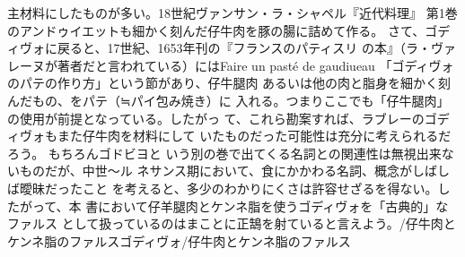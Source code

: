 {{{{  主材料にしたものが多い。18世紀ヴァンサン・ラ・シャペル『近代料理』
  第1巻のアンドゥイエットも細かく刻んだ仔牛肉を豚の腸に詰めて作る。
  さて、ゴディヴォに戻ると、17世紀、1653年刊の『フランスのパティスリ
  の本』（ラ・ヴァレーヌが著者だと言われている）にはFaire un pasté de
  gaudiueau 「ゴディヴォのパテの作り方」という節があり、仔牛腿肉
  あるいは他の肉と脂身を細かく刻んだもの、をパテ（≒パイ包み焼き）に
  入れる。つまりここでも「仔牛腿肉」の使用が前提となっている。したがっ
  て、これら勘案すれば、ラブレーのゴディヴォもまた仔牛肉を材料にして
  いたものだった可能性は充分に考えられるだろう。 もちろんゴドビヨと
  いう別の巻で出てくる名詞との関連性は無視出来ないものだが、中世〜ル
  ネサンス期において、食にかかわる名詞、概念がしばしば曖昧だったこと
  を考えると、多少のわかりにくさは許容せざるを得ない。したがって、本
  書において仔羊腿肉とケンネ脂を使うゴディヴォを「古典的」なファルス
  として扱っているのはまことに正鵠を射ていると言えよう。}/仔牛肉とケンネ脂のファルス}{ゴディヴォ/仔牛肉とケンネ脂のファルス}}\label{godiveau}}



